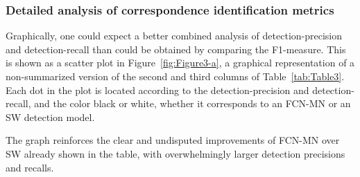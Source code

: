 \documentclass[a4paper,authoryear,review]{elsarticle}
\begin{document}
\subsubsection{Detailed analysis of correspondence identification metrics}
\label{sub:compFCNSW}

Graphically, one could expect a better combined analysis of detection-precision and detection-recall than could be obtained by comparing the F1-measure. This is shown as a scatter plot in Figure~\ref{fig:Figure3-a}, a graphical representation of a non-summarized version of the second and third columns of Table~\ref{tab:Table3}. Each dot in the plot is located according to the detection-precision and detection-recall, and the color black or white, whether it corresponds to an FCN-MN or an SW detection model.

The graph reinforces the clear and undisputed improvements of FCN-MN over SW already shown in the table, with overwhelmingly larger detection precisions and recalls. 
\end{document}
